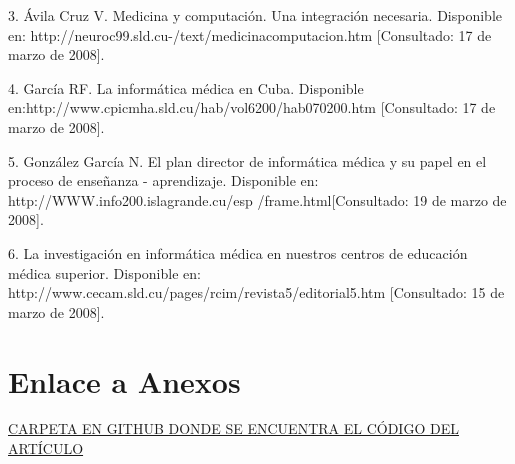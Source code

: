 \documentclass[a4paper,10pt]{article}
\begin{document}
3. Ávila Cruz V. Medicina y computación. Una integración necesaria. Disponible en: http://neuroc99.sld.cu-/text/medicinacomputacion.htm [Consultado: 17 de marzo de 2008].

4. García RF. La informática médica en Cuba. Disponible en:http://www.cpicmha.sld.cu/hab/vol6200/hab070200.htm [Consultado: 17 de marzo de 2008].

5. González García N. El plan director de informática médica y su papel en el proceso de enseñanza - aprendizaje. Disponible en: http://WWW.info200.islagrande.cu/esp /frame.html[Consultado: 19 de marzo de 2008]. 

6. La investigación en informática médica en nuestros centros de educación médica superior. Disponible en: http://www.cecam.sld.cu/pages/rcim/revista5/editorial5.htm [Consultado: 15 de marzo de 2008].

\newpage %
\section*{Enlace a Anexos}
\href{https://github.com/WellingtonMuCe/INTELIGENCIA-ARTIFICIAL-2024-2/tree/master/Aplicaciones%20de%20la%20Inteligencia%20Artifical%20Perspectivas%20y%20problemas}{CARPETA EN GITHUB DONDE SE ENCUENTRA EL CÓDIGO DEL ARTÍCULO}
\end{document}
